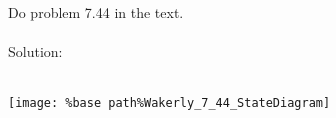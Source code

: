 Do problem 7.44 in the text. \\ \\

Solution: \\ \\
\begin{center}
  \texttt{[image: \%base path\%Wakerly\_7\_44\_StateDiagram]}
\end{center}
